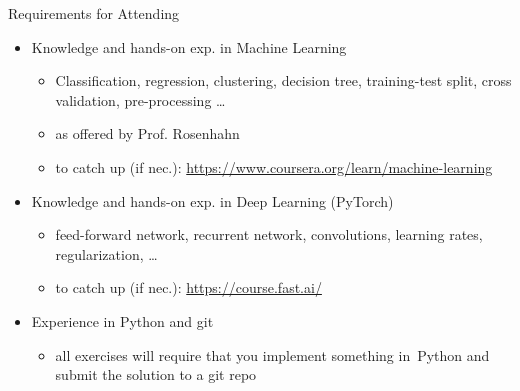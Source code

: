 \documentclass[aspectratio=169, handout]{../latex_main/tntbeamer}  %
\begin{document}
\begin{frame}[c]{Requirements for Attending}

\begin{itemize}
  \item Knowledge and hands-on exp. in \alert{Machine Learning}\\ 
  \begin{itemize}
    \item Classification, regression, clustering, decision tree, training-test split, cross validation, pre-processing \ldots
    \item as offered by Prof. Rosenhahn
    \item to catch up (if nec.): \url{https://www.coursera.org/learn/machine-learning} 
  \end{itemize}
  \pause
  \item Knowledge and hands-on exp. in \alert{Deep Learning} (PyTorch)\\ 
  \begin{itemize}
    \item feed-forward network, recurrent network, convolutions, learning rates, regularization, \ldots 
    \item to catch up (if nec.): \url{https://course.fast.ai/}
  \end{itemize}
  \pause
  \item Experience in \alert{Python and git}\\ 
  \begin{itemize}
    \item all exercises will require 
    that you implement something in~Python and\\ submit the solution to a git repo
  \end{itemize}
\end{itemize}

\end{frame}
\end{document}
